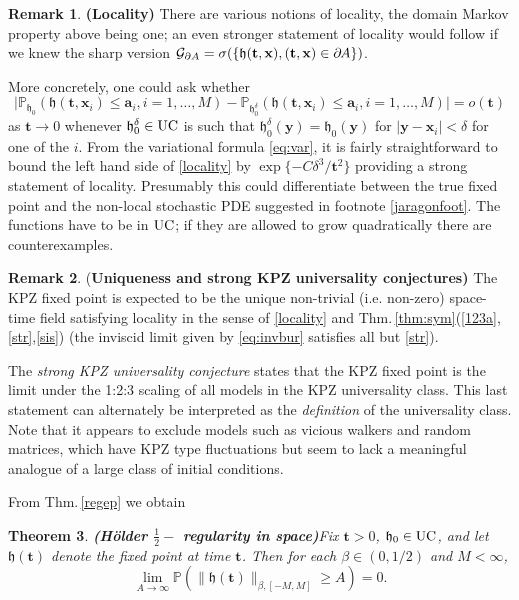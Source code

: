\documentclass[letterpaper,reqno,11pt,oneside,final]{amsart}
\newtheorem{thm}{Theorem}[section]
\theoremstyle{definition}
\newtheorem{rem}[thm]{Remark}
\newcommand{\fh}{\mathfrak{h}}
\newcommand{\pp}{\mathbb{P}}
\newcommand{\tsm}{\hspace{-0.1em}}
\newcommand{\uptext}[1]{\text{\upshape{#1}}}
\DeclareMathOperator{\UC}{\uptext{UC}}
\newcommand{\ft}{\mathbf{t}}
\newcommand{\fx}{\mathbf{x}}
\newcommand{\fy}{\mathbf{y}}
\newcommand{\fa}{\mathbf{a}}
\numberwithin{equation}{section}
\begin{document}
\begin{rem}{\bf (Locality)}  
\enspace There are various notions of locality, the domain Markov 
property above being one; an even stronger statement of locality would follow if we knew the sharp version $\mathcal{G}_{\partial A}=\sigma(\{ \fh(\ft,\fx), (\ft,\fx)\in \partial\tsm A\})$.

\noindent More concretely, one could ask whether
\begin{equation}\label{locality}
\big|\pp_{\fh_0}(\fh(\ft,\fx_i) \le \fa_i, i=1,\ldots,M ) -\pp_{\fh_0^\delta}(\fh(\ft,\fx_i) \le \fa_i, i=1,\ldots,M )\big|=o(\ft)
\end{equation}
 as $\ft\to 0$
whenever $\fh_0^\delta\in\UC$ is such that $\fh^\delta_0(\fy) = \fh_0 (\fy)$ for $|\fy-\fx_i|<\delta$ for one of the $i$.  From the variational formula \eqref{eq:var}, it is fairly straightforward to bound the left hand side of  \eqref{locality} by 
$\exp\{ - C\delta^3/\ft^2 \}$ providing a strong statement of locality.  Presumably this could differentiate between the true fixed point and the non-local stochastic PDE suggested in footnote \ref{jaragonfoot}. The functions have to be in $\UC$; if they are allowed to grow quadratically there are counterexamples.
\end{rem}

\begin{rem}{(\bf Uniqueness and strong KPZ universality conjectures)}
\enspace The KPZ fixed point is expected to be the unique non-trivial (i.e. non-zero) space-time field satisfying locality in the sense of \eqref{locality} and Thm.\,\ref{thm:sym}(\ref{123a},\ref{str},\ref{sis})  (the inviscid limit given by \eqref{eq:invbur} satisfies all but \eqref{str}).

\noindent The \emph{strong KPZ universality conjecture} states that the KPZ fixed point is the limit under the 1:2:3 scaling of all models in the KPZ universality class.
This last statement can alternately be interpreted as the \emph{definition} of the universality class.
Note that it appears to exclude models such as vicious walkers and random matrices, which
have KPZ type fluctuations but seem to  lack a meaningful analogue of a large class of initial conditions.
\end{rem}

From Thm.\,\ref{regep} we obtain

\begin{thm}{\bf (H\"older $\frac12-$ regularity in space)}\label{reg}
\enspace Fix $\ft>0$, $\fh_0\in \UC$, and let $\fh(\ft)$ denote the fixed point at
time $\ft$. 
Then for each $\beta\in (0,1/2)$ and $M<\infty$,
\begin{equation}
\lim_{A\to \infty}  \pp( \| \fh(\ft)\|_{\beta, [-M,M]}\ge A) =0.\label{tight1}
\end{equation}
\end{thm} 
\end{document}
